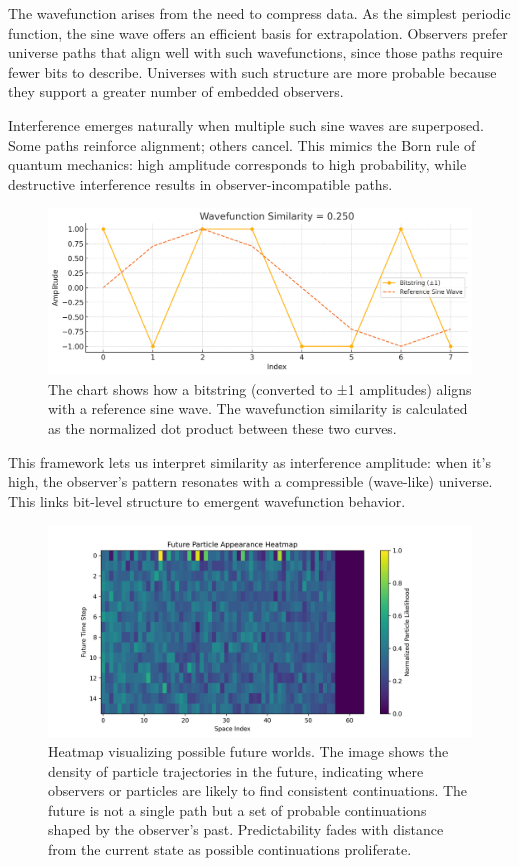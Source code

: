 \documentclass[12pt]{article}
\begin{document}
The wavefunction arises from the need to compress data. As the simplest periodic function, the sine wave offers an efficient basis for extrapolation. Observers prefer universe paths that align well with such wavefunctions, since those paths require fewer bits to describe. Universes with such structure are more probable because they support a greater number of embedded observers.

Interference emerges naturally when multiple such sine waves are superposed. Some paths reinforce alignment; others cancel. This mimics the Born rule of quantum mechanics: high amplitude corresponds to high probability, while destructive interference results in observer-incompatible paths.

\begin{figure}[h!]
    \centering
    \includegraphics[width=1.0\textwidth]{figures/wavefunction_similarity.png}
    \caption{The chart shows how a bitstring (converted to ±1 amplitudes) aligns with a reference sine wave.
        The wavefunction similarity is calculated as the normalized dot product between these two curves.}
    \label{fig:wavefunction_similarity}
\end{figure}


This framework lets us interpret similarity as interference amplitude: when it's high, the observer's pattern resonates with a compressible (wave-like) universe. This links bit-level structure to emergent wavefunction behavior.

\begin{figure}[h!]
    \centering
    \includegraphics[width=1.0\textwidth]{figures/future_particle_heatmap.png}
    \caption{Heatmap visualizing possible future worlds. The image shows the density of particle trajectories in the future, indicating where observers or particles are likely to find consistent continuations. The future is not a single path but a set of probable continuations shaped by the observer's past. Predictability fades with distance from the current state as possible continuations proliferate.}
    \label{fig:future_particle_heatmap}
\end{figure}
\end{document}
